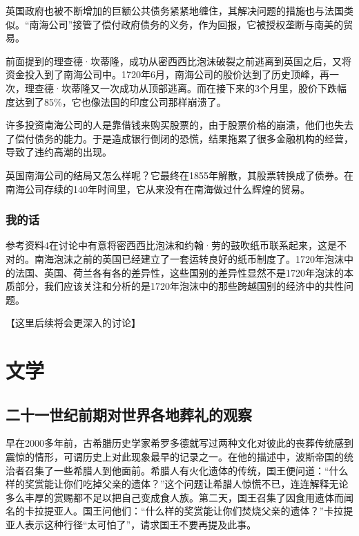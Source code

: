 \documentclass[12pt,oneside]{book}
\begin{document}
英国政府也被不断增加的巨额公共债务紧紧地缠住，其解决问题的措施也与法国类似。“南海公司”接管了偿付政府债务的义务，作为回报，它被授权垄断与南美的贸易。

前面提到的理查德·坎蒂隆，成功从密西西比泡沫破裂之前逃离到英国之后，又将资金投入到了南海公司中。1720年6月，南海公司的股价达到了历史顶峰，再一次，理查德·坎蒂隆又一次成功从顶部逃离。而在接下来的3个月里，股价下跌幅度达到了85\%，它也像法国的印度公司那样崩溃了。

许多投资南海公司的人是靠借钱来购买股票的，由于股票价格的崩溃，他们也失去了偿付债务的能力。于是造成银行倒闭的恐慌，结果拖累了很多金融机构的经营，导致了违约高潮的出现。

英国南海公司的结局又怎么样呢？它最终在1855年解散，其股票转换成了债券。在南海公司存续的140年时间里，它从来没有在南海做过什么辉煌的贸易。


\section{我的话}
参考资料4在讨论中有意将密西西比泡沫和约翰·劳的鼓吹纸币联系起来，这是不对的。南海泡沫之前的英国已经建立了一套运转良好的纸币制度了。1720年泡沫中的法国、英国、荷兰各有各的差异性，这些国别的差异性显然不是1720年泡沫的本质部分，我们应该关注和分析的是1720年泡沫中的那些跨越国别的经济中的共性问题。

【这里后续将会更深入的讨论】




\part{文学}
\chapter{二十一世纪前期对世界各地葬礼的观察}

\begin{bookref}[frametitle={\cite{好好告别：世界葬礼观察手记}}]
早在2000多年前，古希腊历史学家希罗多德就写过两种文化对彼此的丧葬传统感到震惊的情形，可谓历史上对此现象最早的记录之一。在他的描述中，波斯帝国的统治者召集了一些希腊人到他面前。希腊人有火化遗体的传统，国王便问道：“什么样的奖赏能让你们吃掉父亲的遗体？”这个问题让希腊人惊慌不已，连连解释无论多么丰厚的赏赐都不足以把自己变成食人族。第二天，国王召集了因食用遗体而闻名的卡拉提亚人。国王问他们：“什么样的奖赏能让你们焚烧父亲的遗体？”卡拉提亚人表示这种行径“太可怕了”，请求国王不要再提及此事。

\end{bookref}
\end{document}
